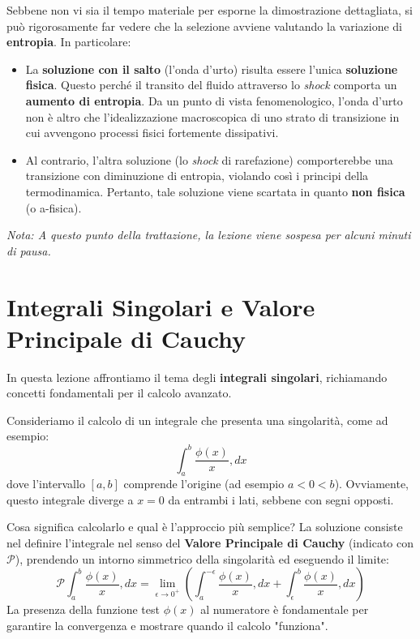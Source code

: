 Sebbene non vi sia il tempo materiale per esporne la dimostrazione dettagliata, si può rigorosamente far vedere che la selezione avviene valutando la variazione di \textbf{entropia}. In particolare:
\begin{itemize}
\item La \textbf{soluzione con il salto} (l'onda d'urto) risulta essere l'unica \textbf{soluzione fisica}. Questo perché il transito del fluido attraverso lo \textit{shock} comporta un \textbf{aumento di entropia}. Da un punto di vista fenomenologico, l'onda d'urto non è altro che l'idealizzazione macroscopica di uno strato di transizione in cui avvengono processi fisici fortemente dissipativi.
\item Al contrario, l'altra soluzione (lo \textit{shock} di rarefazione) comporterebbe una transizione con diminuzione di entropia, violando così i principi della termodinamica. Pertanto, tale soluzione viene scartata in quanto \textbf{non fisica} (o a-fisica).
\end{itemize}

\vspace{1em}
\noindent \textit{Nota: A questo punto della trattazione, la lezione viene sospesa per alcuni minuti di pausa.}

\section{Integrali Singolari e Valore Principale di Cauchy}

In questa lezione affrontiamo il tema degli \textbf{integrali singolari}, richiamando concetti fondamentali per il calcolo avanzato.

Consideriamo il calcolo di un integrale che presenta una singolarità, come ad esempio:
\begin{equation}
\int_a^b \frac{\phi(x)}{x} , dx
\end{equation}
dove l'intervallo $[a, b]$ comprende l'origine (ad esempio $a < 0 < b$). Ovviamente, questo integrale diverge a $x=0$ da entrambi i lati, sebbene con segni opposti.

Cosa significa calcolarlo e qual è l'approccio più semplice? La soluzione consiste nel definire l'integrale nel senso del \textbf{Valore Principale di Cauchy} (indicato con $\mathcal{P}$), prendendo un intorno simmetrico della singolarità ed eseguendo il limite:
\begin{equation}
\mathcal{P} \int_a^b \frac{\phi(x)}{x} , dx = \lim_{\epsilon \to 0^+} \left( \int_a^{-\epsilon} \frac{\phi(x)}{x} , dx + \int_{\epsilon}^b \frac{\phi(x)}{x} , dx \right)
\end{equation}
La presenza della funzione test $\phi(x)$ al numeratore è fondamentale per garantire la convergenza e mostrare quando il calcolo "funziona".

